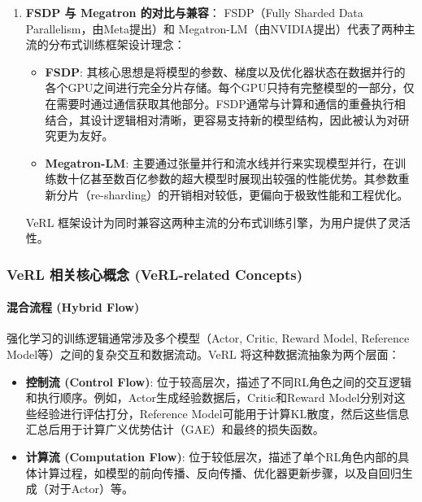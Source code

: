 \documentclass{pkuthesis}
\begin{document}
\begin{enumerate}
    \item \textbf{FSDP 与 Megatron 的对比与兼容}：
    FSDP（Fully Sharded Data Parallelism，由Meta提出）和 Megatron-LM（由NVIDIA提出）代表了两种主流的分布式训练框架设计理念：
    \begin{itemize}
        \item \textbf{FSDP}: 其核心思想是将模型的参数、梯度以及优化器状态在数据并行的各个GPU之间进行完全分片存储。每个GPU只持有完整模型的一部分，仅在需要时通过通信获取其他部分。FSDP通常与计算和通信的重叠执行相结合，其设计逻辑相对清晰，更容易支持新的模型结构，因此被认为对研究更为友好。
        \item \textbf{Megatron-LM}: 主要通过张量并行和流水线并行来实现模型并行，在训练数十亿甚至数百亿参数的超大模型时展现出较强的性能优势。其参数重新分片（re-sharding）的开销相对较低，更偏向于极致性能和工程优化。
    \end{itemize}
    VeRL 框架设计为同时兼容这两种主流的分布式训练引擎，为用户提供了灵活性。
\end{enumerate}

\subsubsection{VeRL 相关核心概念 (VeRL-related Concepts)}
\paragraph{混合流程 (Hybrid Flow)}
强化学习的训练逻辑通常涉及多个模型（Actor, Critic, Reward Model, Reference Model等）之间的复杂交互和数据流动。VeRL 将这种数据流抽象为两个层面：
\begin{itemize}
    \item \textbf{控制流 (Control Flow)}: 位于较高层次，描述了不同RL角色之间的交互逻辑和执行顺序。例如，Actor生成经验数据后，Critic和Reward Model分别对这些经验进行评估打分，Reference Model可能用于计算KL散度，然后这些信息汇总后用于计算广义优势估计（GAE）和最终的损失函数。
    \item \textbf{计算流 (Computation Flow)}: 位于较低层次，描述了单个RL角色内部的具体计算过程，如模型的前向传播、反向传播、优化器更新步骤，以及自回归生成（对于Actor）等。
\end{itemize}
\end{document}
